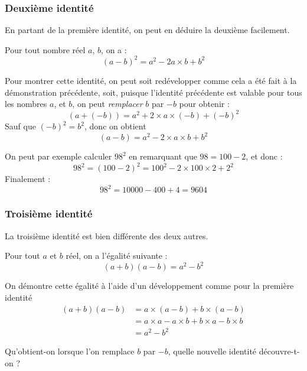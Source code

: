 \documentclass[11pt]{article}
\begin{document}
\subsubsection{Deuxième identité}
\label{sec:org2ae23af}
En partant de la première identité, on peut en déduire la deuxième facilement.
\begin{prop}
  Pour tout nombre réel $a$, $b$, on a :
  \[
    (a-b)^{2} = a^{2} - 2a \times b + b^{2}
  \]
\end{prop}

\begin{dem}
  Pour montrer cette identité, on peut soit redévelopper comme cela a été fait à
  la démonstration précédente, soit, puisque l'identité précédente est valable
  pour tous les nombres $a$, et $b$, on peut \emph{remplacer} $b$ par $-b$ pour
  obtenir :
  \[
    (a + (-b)) = a^{2} + 2 \times a \times (-b) + (-b)^{2}
  \]
  Sauf que $(-b)^{2} = b^{2}$, donc on obtient
  \[
    (a-b) = a^{2} - 2 \times a \times b + b^{2}
  \]
\end{dem}

\begin{ex}
  On peut par exemple calculer $98^{2}$ en remarquant que $98= 100 - 2$, et donc :
  \[
    98^{2} = (100-2)^{2} = 100^{2} - 2 \times 100 \times 2 + 2^{2}
  \]
  Finalement :
  \[
    98^{2} = 10000 - 400 + 4 =  9604
  \]
\end{ex}

\subsubsection{Troisième identité}
\label{sec:org3b58b7f}
La troisième identité est bien différente des deux autres.
\begin{prop}
  Pour tout $a$ et $b$ réel, on a l'égalité suivante :
  \[
    (a+b)(a-b) = a^{2} - b^{2}
  \]
\end{prop}

\begin{dem}
On démontre cette égalité à l'aide d'un développement comme pour la première identité
\begin{align*}
  (a+b)(a-b) &= a\times (a - b) + b \times (a - b)\\
             &= a\times a - a \times b + b \times a - b \times b \\
             &= a^{2} - b^{2}
\end{align*}
\end{dem}

\begin{rem}
   Qu'obtient-on lorsque l'on remplace $b$ par $-b$, quelle nouvelle identité découvre-t-on  ?
\end{rem}
\end{document}
